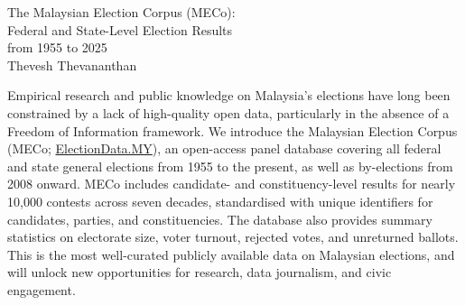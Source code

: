 \documentclass[11pt]{article}
\begin{document}
\def\acronymend{MECo}
\def\acronym{\acronymend\space}

\phantom{Thevesh}

\vfill

\begin{center}
	\begin{minipage}{0.88\linewidth}
		\begin{center}
			\LARGE
			The Malaysian Election Corpus (\acronymend):\\Federal and State-Level Election Results\\from 1955 to 2025 \\[0.21in]
			\Large
			Thevesh Thevananthan\\[0.15in]  %
		\end{center}
		\large 
		Empirical research and public knowledge on Malaysia's elections have long been constrained by a lack of high-quality open data, particularly in the absence of a Freedom of Information framework. We introduce the Malaysian Election Corpus (MECo; \href{https://electiondata.my}{ElectionData.MY}), an open-access panel database covering all federal and state general elections from 1955 to the present, as well as by-elections from 2008 onward. MECo includes candidate- and constituency-level results for nearly 10,000 contests across seven decades, standardised with unique identifiers for candidates, parties, and constituencies. The database also provides summary statistics on electorate size, voter turnout, rejected votes, and unreturned ballots. This is the most well-curated publicly available data on Malaysian elections, and will unlock new opportunities for research, data journalism, and civic engagement.
	\end{minipage}
\end{center}

\vfill

\phantom{Word Count:}

\newpage
{}

\def\TOTALBALLOTS{25,552}
\def\TOTALCONTESTS{9,705}
\def\TOTALPARTIES{99}
\def\TOTALCONTESTSSTATE{6,935}
\def\TOTALCONTESTSFEDERAL{2,770}
\def\TOTALELECTIONS{16}
\end{document}
